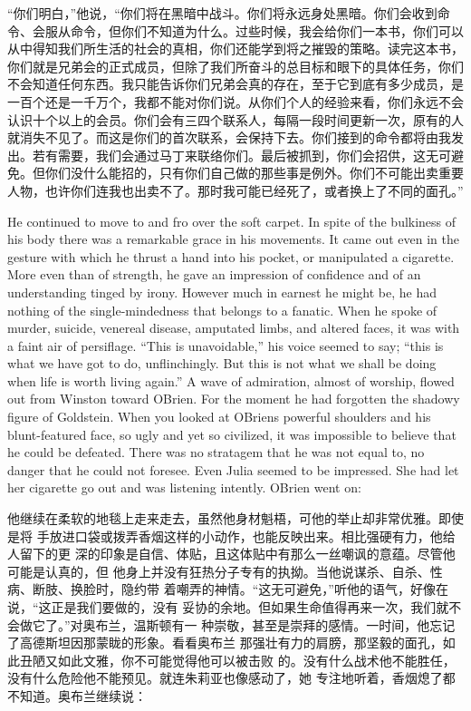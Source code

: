 \begin{paracol}{2}
``你们明白，''他说，``你们将在黑暗中战斗。你们将永远身处黑暗。你们会收到命令、会服从命令，但你们不知道为什么。过些时候，我会给你们一本书，你们可以从中得知我们所生活的社会的真相，你们还能学到将之摧毁的策略。读完这本书，你们就是兄弟会的正式成员，但除了我们所奋斗的总目标和眼下的具体任务，你们不会知道任何东西。我只能告诉你们兄弟会真的存在，至于它到底有多少成员，是一百个还是一千万个，我都不能对你们说。从你们个人的经验来看，你们永远不会认识十个以上的会员。你们会有三四个联系人，每隔一段时间更新一次，原有的人就消失不见了。而这是你们的首次联系，会保持下去。你们接到的命令都将由我发出。若有需要，我们会通过马丁来联络你们。最后被抓到，你们会招供，这无可避免。但你们没什么能招的，只有你们自己做的那些事是例外。你们不可能出卖重要人物，也许你们连我也出卖不了。那时我可能已经死了，或者换上了不同的面孔。''

\switchcolumn*

He continued to move to and fro over the soft carpet. In spite of the
bulkiness of his body there was a remarkable grace in his movements. It
came out even in the gesture with which he thrust a hand into his
pocket, or manipulated a cigarette. More even than of strength, he gave
an impression of confidence and of an understanding tinged by irony.
However much in earnest he might be, he had nothing of the
single-mindedness that belongs to a fanatic. When he spoke of murder,
suicide, venereal disease, amputated limbs, and altered faces, it was
with a faint air of persiflage. ``This is unavoidable,'' his voice seemed
to say; ``this is what we have got to do, unflinchingly. But this is not
what we shall be doing when life is worth living again.'' A wave of
admiration, almost of worship, flowed out from Winston toward
O\textquotesingle Brien. For the moment he had forgotten the shadowy
figure of Goldstein. When you looked at
O\textquotesingle Brien\textquotesingle s powerful shoulders and his
blunt-featured face, so ugly and yet so civilized, it was impossible to
believe that he could be defeated. There was no stratagem that he was
not equal to, no danger that he could not foresee. Even Julia seemed to
be impressed. She had let her cigarette go out and was listening
intently. O\textquotesingle Brien went on:

\switchcolumn

他继续在柔软的地毯上走来走去，虽然他身材魁梧，可他的举止却非常优雅。即使是将
手放进口袋或拨弄香烟这样的小动作，也能反映出来。相比强硬有力，他给人留下的更
深的印象是自信、体贴，且这体贴中有那么一丝嘲讽的意蕴。尽管他可能是认真的，但
他身上并没有狂热分子专有的执拗。当他说谋杀、自杀、性病、断肢、换脸时，隐约带
着嘲弄的神情。``这无可避免，''听他的语气，好像在说，``这正是我们要做的，没有
妥协的余地。但如果生命值得再来一次，我们就不会做它了。''对奥布兰，温斯顿有一
种崇敬，甚至是崇拜的感情。一时间，他忘记了高德斯坦因那蒙眬的形象。看看奥布兰
那强壮有力的肩膀，那坚毅的面孔，如此丑陋又如此文雅，你不可能觉得他可以被击败
的。没有什么战术他不能胜任，没有什么危险他不能预见。就连朱莉亚也像感动了，她
专注地听着，香烟熄了都不知道。奥布兰继续说：


\end{paracol}
